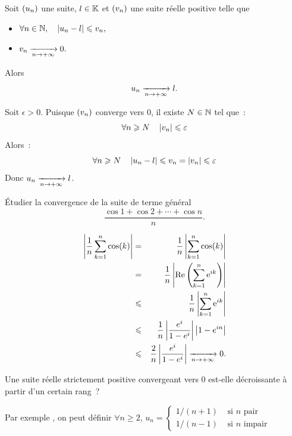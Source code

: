 \documentclass{magnolia}
\begin{document}




\begin{proposition}[utile=-3]
Soit $\left(u_n\right)$ une suite, $l\in\mathbb{K}$ et $\left(v_n\right)$ une suite réelle
positive telle que
\begin{itemize}
\item $\forall n\in\mathbb{N} ,\quad \left|u_n-l\right|\leqslant v_n,$
\item $v_n\xrightarrow[n\rightarrow +\infty]{} 0.$
\end{itemize}
Alors
\[u_n \xrightarrow[n\rightarrow +\infty]{} l.\]
\end{proposition}

\begin{preuve}
Soit $\epsilon>0$. Puisque $\left(v_n\right)$ converge vers 0, il existe $N\in\mathbb{N}$ tel
que~:
\[\forall n\geqslant N \quad \left|v_n\right|\leqslant\varepsilon\]
Alors~:
\[\forall n\geqslant N \quad \left|u_n-l\right|\leqslant v_n=\left|v_n\right|\leqslant\varepsilon\]
Donc $u_n\xrightarrow[n\rightarrow +\infty]{} l$.
\end{preuve}

\begin{exos}
\exo Étudier la convergence de la suite de terme général
  \[\frac{\cos 1+\cos 2+\cdots+\cos n}{n}.\]
  
  \begin{sol}
  \begin{eqnarray*}
  \left|\frac{1}{n}\sum_{k=1}^n\cos(k)\right|&=&\frac{1}{n}\left|\sum_{k=1}^n\cos(k)\right|\\
  &=&\frac{1}{n}\left|\mathop{\rm Re}\left(\sum_{k=1}^n{\rm e}^{ik}\right)\right|\\
  &\leqslant& \frac{1}{n}\left|\sum_{k=1}^n{\rm e}^{ik}\right|\\
  &\leqslant& \frac{1}{n}\left|\frac{e^i}{1-e^i}\right|\left|1-e^{in}\right|\\
  &\leqslant& \frac{2}{n}\left|\frac{e^i}{1-e^i}\right|\xrightarrow[n\rightarrow +\infty]{}{0}.
  \end{eqnarray*}
  \end{sol}
\exo Une suite réelle strictement positive convergeant vers 0 est-elle
  décroissante à partir d'un certain rang~?
  \begin{sol}
  Par exemple , on peut définir $\forall n\geq 2$, $u_n=\begin{cases}1/(n+1) &\text{ si } n \text{ pair}\\
  1/(n-1) &\text{ si } n \text{ impair}
  \end{cases}$ 
  \end{sol}
\end{exos}
\end{document}
